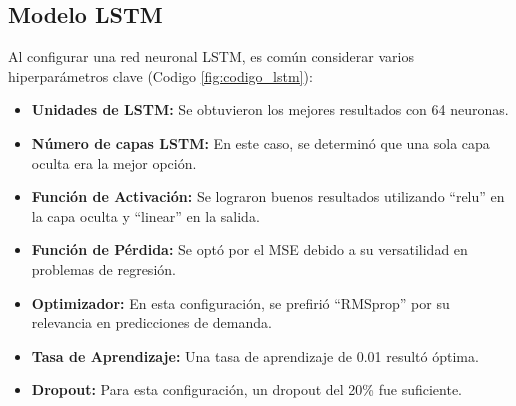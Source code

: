 
\subsection{Modelo LSTM}


Al configurar una red neuronal LSTM, es común considerar varios hiperparámetros
clave (Codigo \ref{fig:codigo_lstm}):

\begin{itemize}
  \item  \textbf{Unidades de LSTM:} Se obtuvieron los mejores resultados con 64 neuronas.
   
  
  \item \textbf{Número de capas LSTM:} En este caso, se determinó que una sola capa oculta era la mejor opción.

 
  \item \textbf{Función de Activación:} Se lograron buenos resultados utilizando “relu” en la capa oculta y “linear” en la salida.

 
  \item \textbf{Función de Pérdida:} Se optó por el MSE debido a su versatilidad en problemas de regresión.

 
  \item \textbf{Optimizador:} En esta configuración, se prefirió “RMSprop” por su relevancia en predicciones de demanda.

 
  \item \textbf{Tasa de Aprendizaje:} Una tasa de aprendizaje de 0.01 resultó óptima.

 
  \item \textbf{Dropout:} Para esta configuración, un dropout del 20\% fue suficiente.
\end{itemize}

